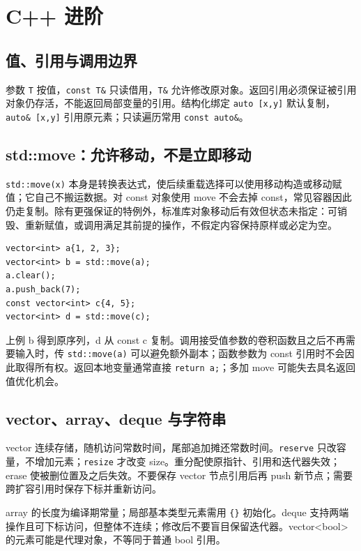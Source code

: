 

\chapter{C++ 进阶}



\newpage


\section{值、引用与调用边界}
参数 \texttt{T} 按值，\texttt{const T\&} 只读借用，\texttt{T\&} 允许修改原对象。返回引用必须保证被引用对象仍存活，不能返回局部变量的引用。结构化绑定 \texttt{auto [x,y]} 默认复制，\texttt{auto\& [x,y]} 引用原元素；只读遍历常用 \texttt{const auto\&}。

\section{std::move：允许移动，不是立即移动}\label{infra-move}
\texttt{std::move(x)} 本身是转换表达式，使后续重载选择可以使用移动构造或移动赋值；它自己不搬运数据。对 const 对象使用 move 不会去掉 const，常见容器因此仍走复制。除有更强保证的特例外，标准库对象移动后有效但状态未指定：可销毁、重新赋值，或调用满足其前提的操作，不假定内容保持原样或必定为空。
\begin{lstlisting}
vector<int> a{1, 2, 3};
vector<int> b = std::move(a);
a.clear();
a.push_back(7);
const vector<int> c{4, 5};
vector<int> d = std::move(c);
\end{lstlisting}
上例 b 得到原序列，d 从 const c 复制。调用接受值参数的卷积函数且之后不再需要输入时，传 \texttt{std::move(a)} 可以避免额外副本；函数参数为 const 引用时不会因此取得所有权。返回本地变量通常直接 \texttt{return a;}；多加 move 可能失去具名返回值优化机会。

\section{vector、array、deque 与字符串}
vector 连续存储，随机访问常数时间，尾部追加摊还常数时间。\texttt{reserve} 只改容量，不增加元素；\texttt{resize} 才改变 size。重分配使原指针、引用和迭代器失效；erase 使被删位置及之后失效。不要保存 vector 节点引用后再 push 新节点；需要跨扩容引用时保存下标并重新访问。

array 的长度为编译期常量；局部基本类型元素需用 \texttt{\{\}} 初始化。deque 支持两端操作且可下标访问，但整体不连续；修改后不要盲目保留迭代器。vector<bool> 的元素可能是代理对象，不等同于普通 bool 引用。

